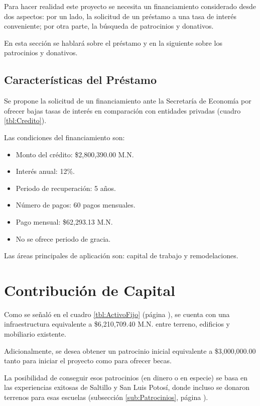 Para hacer realidad este proyecto se necesita un financiamiento considerado desde dos aspectos: por un lado, la solicitud de un préstamo a una tasa de interés conveniente; por otra parte, la búsqueda de patrocinios y donativos.

En esta sección se hablará sobre el préstamo y en la siguiente sobre los patrocinios y donativos.

\subsection{Características del Préstamo}

Se propone la solicitud de un financiamiento ante la Secretaría de Economía por ofrecer bajas tasas de interés en comparación con entidades privadas (cuadro \ref{tbl:Credito}).

Las condiciones del financiamiento son:

\begin{itemize}
	\item Monto del crédito: \$2,800,390.00 M.N.
	\item Interés anual: 12\%.
	\item Periodo de recuperación: 5 años.
	\item Número de pagos: 60 pagos mensuales.
	\item Pago mensual: \$62,293.13 M.N.
	\item No se ofrece periodo de gracia.
\end{itemize}

Las áreas principales de aplicación son: capital de trabajo y remodelaciones.



\section{Contribución de Capital}
\label{sec:Capital}

Como se señaló en el cuadro \ref{tbl:ActivoFijo} (página \pageref{tbl:ActivoFijo}), se cuenta con una infraestructura equivalente a \$6,210,709.40 M.N. entre terreno, edificios y mobiliario existente.

Adicionalmente, se desea obtener un patrocinio inicial equivalente a \$3,000,000.00 tanto para iniciar el proyecto como para ofrecer becas.

La posibilidad de conseguir esos patrocinios (en dinero o en especie) se basa en las experiencias exitosas de Saltillo y San Luis Potosí, donde incluso se donaron terrenos para esas escuelas (subsección \ref{sub:Patrocinios}, página \pageref{sub:Patrocinios}).

